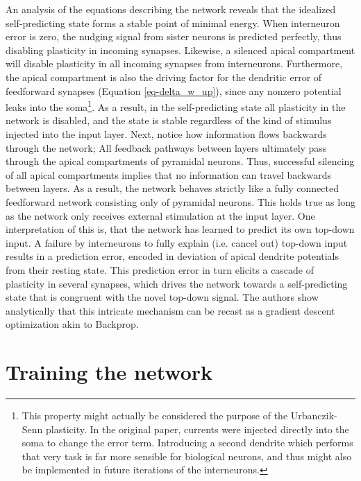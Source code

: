 An analysis of the equations describing the network reveals that the idealized self-predicting state forms a stable
point of minimal energy. When interneuron error is zero, the nudging signal from sister neurons is predicted perfectly,
thus disabling plasticity in incoming synapses. Likewise, a silenced apical compartment will disable plasticity in all
incoming synapses from interneurons. Furthermore, the apical compartment is also the driving factor for the dendritic
error of feedforward synapses (Equation \ref{eq-delta_w_up}), since any nonzero potential leaks into the
soma\footnote{This property might actually be considered the purpose of the Urbanczik-Senn plasticity. In the original
paper, currents were injected directly into the soma to change the error term. Introducing a second dendrite which
performs that very task is far more sensible for biological neurons, and thus might also be implemented in future
iterations of the interneurons.}. As a result, in the self-predicting state all plasticity in the network is disabled, and the
state is stable regardless of the kind of stimulus injected into the input layer. Next, notice how information flows
backwards through the network; All feedback pathways between layers ultimately pass through the apical compartments of
pyramidal neurons. Thus, successful silencing of all apical compartments implies that no information can travel
backwards between layers. As a result, the network behaves strictly like a fully connected feedforward network
consisting only of pyramidal neurons. This holds true as long as the network only receives external stimulation at the
input layer. One interpretation of this is, that the network has learned to predict its own top-down input. A failure by
interneurons to fully explain (i.e. cancel out) top-down input results in a prediction error, encoded in deviation
of apical dendrite potentials from their resting state. This prediction error in turn elicits a cascade of plasticity in
several synapses, which drives the network towards a self-predicting state that is congruent with the novel top-down
signal. The authors show analytically that this intricate mechanism can be recast as a gradient descent optimization
akin to Backprop.



\section{Training the network}

